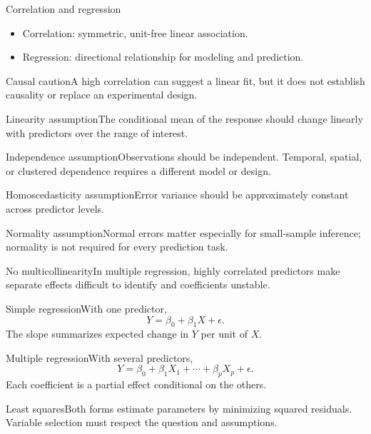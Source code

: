 \documentclass[10pt,aspectratio=169]{beamer}
\begin{document}
\begin{frame}{Correlation and regression}\small\begin{itemize}\item Correlation: symmetric, unit-free linear association.\item Regression: directional relationship for modeling and prediction.\end{itemize}\end{frame}
\begin{frame}{Causal caution}\small A high correlation can suggest a linear fit, but it does not establish causality or replace an experimental design.\end{frame}
\begin{frame}{Linearity assumption}\small The conditional mean of the response should change linearly with predictors over the range of interest.\end{frame}
\begin{frame}{Independence assumption}\small Observations should be independent. Temporal, spatial, or clustered dependence requires a different model or design.\end{frame}
\begin{frame}{Homoscedasticity assumption}\small Error variance should be approximately constant across predictor levels.\end{frame}
\begin{frame}{Normality assumption}\small Normal errors matter especially for small-sample inference; normality is not required for every prediction task.\end{frame}
\begin{frame}{No multicollinearity}\small In multiple regression, highly correlated predictors make separate effects difficult to identify and coefficients unstable.\end{frame}
\begin{frame}{Simple regression}\small With one predictor,\[Y=\beta_0+\beta_1X+\epsilon.\]The slope summarizes expected change in $Y$ per unit of $X$.\end{frame}
\begin{frame}{Multiple regression}\small With several predictors,\[Y=\beta_0+\beta_1X_1+\cdots+\beta_pX_p+\epsilon.\]Each coefficient is a partial effect conditional on the others.\end{frame}
\begin{frame}{Least squares}\small Both forms estimate parameters by minimizing squared residuals. Variable selection must respect the question and assumptions.\end{frame}
\end{document}
